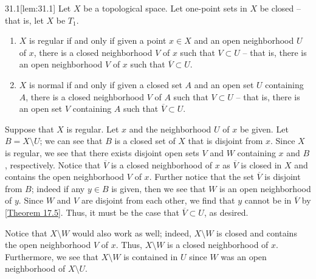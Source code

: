 \begin{thmBox}[Lemma]{31.1}[lem:31.1]
    Let \( X \) be a topological space. 
    Let one-point sets in \( X \) be closed -- that is, let \( X \) be 
    \( T_{ 1 } \).

    \begin{enumerate}[label = (\alph*)]
        \item \( X \) is regular if and only if given a point \( x \in X \) and 
            an open neighborhood \( U \) of \( x \), there is a closed 
            neighborhood \( V \) of \( x \) such that \( V \subset U \) --
            that is, there is an open neighborhood \( V \) of \( x \) such
            that \( \overline{ V } \subset U \).
        \item \( X \) is normal if and only if given a closed set \( A \) and 
            an open set \( U \) containing \( A \), there is a closed 
            neighborhood \( V \) of \( A \) such that \( V \subset U \) -- 
            that is, there is an open set \( V \)
            containing \( A \) such that \( \overline{ V } \subset U \).
    \end{enumerate}

    \baseRule

    \begin{proofBox}

        Suppose that \( X \) is regular.
        Let \( x \) and the neighborhood \( U \) of \( x \) be given.
        Let \( B = X \setminus U \); we can see that \( B \) is a closed set
        of \( X \) that is disjoint from \( x \).
        Since \( X \) is regular, we see that there exists disjoint open sets
        \( V \) and \( W \) containing \( x \) and \( B \), respectively.
        Notice that \( \overline{ V } \) is a closed neighborhood of \( x \) 
        as \( \overline{ V } \) is closed in \( X \) and contains the open 
        neighborhood \( V \) of \( x \).
        Further notice that the set \( \overline{ V } \) is disjoint from
        \( B \); indeed if any \( y \in B \) is given, then we see that 
        \( W \) is an open neighborhood of \( y \). 
        Since \( W \) and \( V \) are disjoint from each other, we find that 
        \( y \) cannot be in \( \overline{ V } \) by 
        [\hyperlink{thm:17.5}{Theorem 17.5}].
        Thus, it must be the case that \( \overline{ V } \subset U \), as 
        desired.

        \baseSkip

        Notice that \( X \setminus W \) would also work as well; indeed,
        \( X \setminus W \) is closed and contains the open neighborhood \( V \)
        of \( x \). Thus, \( X \setminus W \) is a closed neighborhood of 
        \( x \). 
        Furthermore, we see that \( X \setminus W \) is contained in \( U \)
        since \( W \) was an open neighborhood of \( X \setminus U \).


\end{proofBox}
\end{thmBox}
